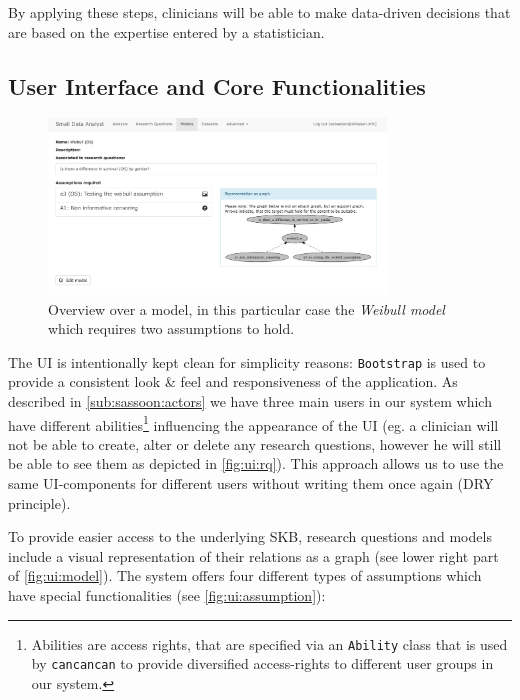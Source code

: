 By applying these steps, clinicians will be able to make data-driven decisions that are based on the expertise entered by a statistician.





\subsection{User Interface and Core Functionalities}
\label{sub:ui}

\begin{figure}[t!]
\centering
\includegraphics[width=0.8\textwidth]{figures/ui_Weibull_Model}
\caption{Overview over a model, in this particular case the \textit{Weibull model} which requires two assumptions to hold.}
\label{fig:ui:model}
\end{figure}

The \gls{UI} is intentionally kept clean for simplicity reasons: \texttt{Bootstrap} is used to provide a consistent look \& feel and responsiveness of the application. As described in \autoref{sub:sassoon:actors} we have three main users in our system which have different abilities\footnote{Abilities are access rights, that are specified via an \texttt{Ability} class that is used by \texttt{cancancan} to provide diversified access-rights to different user groups in our system.} influencing the appearance of the \gls{UI} (eg. a clinician will not be able to create, alter or delete any research questions, however he will still be able to see them as depicted in \autoref{fig:ui:rq}). This approach allows us to use the same \gls{UI}-components for different users without writing them once again (\gls{DRY} principle).


To provide easier access to the underlying \gls{SKB}, research questions and models include a visual representation of their relations as a graph (see lower right part of \autoref{fig:ui:model}). The system offers four different types of assumptions which have special functionalities (see \autoref{fig:ui:assumption}):

